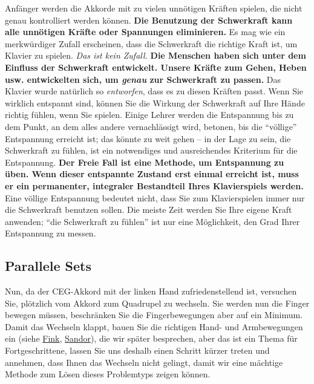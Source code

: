 Anfänger werden die Akkorde mit zu vielen unnötigen Kräften spielen, die nicht genau kontrolliert werden können.
\textbf{Die Benutzung der Schwerkraft kann alle unnötigen Kräfte oder Spannungen eliminieren.}
Es mag wie ein merkwürdiger Zufall erscheinen, dass die Schwerkraft die richtige Kraft ist, um Klavier zu spielen.
\textit{Das ist kein Zufall.}
\textbf{Die Menschen haben sich unter dem Einfluss der Schwerkraft entwickelt.
Unsere Kräfte zum Gehen, Heben usw. entwickelten sich, um \textit{genau} zur Schwerkraft zu passen.}
Das Klavier wurde natürlich so \textit{entworfen}, dass es zu diesen Kräften passt.
Wenn Sie wirklich entspannt sind, können Sie die Wirkung der Schwerkraft auf Ihre Hände richtig fühlen, wenn Sie spielen.
Einige Lehrer werden die Entspannung bis zu dem Punkt, an dem alles andere vernachlässigt wird, betonen, bis die \enquote{völlige} Entspannung erreicht ist; das könnte zu weit gehen -- in der Lage zu sein, die Schwerkraft zu fühlen, ist ein notwendiges und ausreichendes Kriterium für die Entspannung.
\textbf{Der Freie Fall ist eine Methode, um Entspannung zu üben.
Wenn dieser entspannte Zustand erst einmal erreicht ist, muss er ein permanenter, integraler Bestandteil Ihres Klavierspiels werden.}
Eine völlige Entspannung bedeutet nicht, dass Sie zum Klavierspielen immer nur die Schwerkraft benutzen sollen.
Die meiste Zeit werden Sie Ihre eigene Kraft anwenden; \enquote{die Schwerkraft zu fühlen} ist nur eine Möglichkeit, den Grad Ihrer Entspannung zu messen.


\subsection{Parallele Sets}
\label{c1ii11}

Nun, da der CEG-Akkord mit der linken Hand zufriedenstellend ist, versuchen Sie, plötzlich vom Akkord zum Quadrupel zu wechseln.
Sie werden nun die Finger bewegen müssen, beschränken Sie die Fingerbewegungen aber auf ein Minimum.
Damit das Wechseln klappt, bauen Sie die richtigen Hand- und Armbewegungen ein (siehe \hyperref[Fink]{Fink}, \hyperref[Sandor]{Sandor}), die wir später besprechen, aber das ist ein Thema für Fortgeschrittene, lassen Sie uns deshalb einen Schritt kürzer treten und annehmen, dass Ihnen das Wechseln nicht gelingt, damit wir eine mächtige Methode zum Lösen dieses Problemtyps zeigen können.

